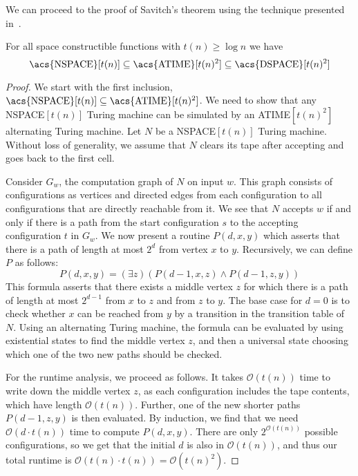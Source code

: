 We can proceed to the proof of Savitch's theorem using the technique presented in~\cite{descriptive-complexity}.
\begin{theorem}
    For all space constructible functions with $t(n) \geq \log n$ we have
    \[
        \text{\upshape \acs{NSPACE}}[t(n)] \subseteq \text{\upshape \acs{ATIME}}[t(n)^2] \subseteq \text{\upshape \acs{DSPACE}}[t(n)^2]
    \]
\end{theorem}

\begin{proof}
    We start with the first inclusion, $\text{\acs{NSPACE}$[t(n)]$} \subseteq \text{\acs{ATIME}$[t(n)^2]$}$.
    We need to show that any \acs{NSPACE}$[t(n)]$ Turing machine can be simulated by an \acs{ATIME}$[t(n)^2]$ alternating Turing machine.
    Let $N$ be a \acs{NSPACE}$[t(n)]$ Turing machine.
    Without loss of generality, we assume that $N$ clears its tape after accepting and goes back to the first cell.

    Consider $G_w$, the computation graph of $N$ on input $w$.
    This graph consists of configurations as vertices and directed edges from each configuration to all configurations that are directly reachable from it.
    We see that $N$ accepts $w$ if and only if there is a path from the start configuration $s$ to the accepting configuration $t$ in $G_w$.
    We now present a routine $P(d, x, y)$ which asserts that there is a path of length at most $2^{d}$ from vertex $x$ to $y$.
    Recursively, we can define $P$ as follows:
    \[
        P(d, x, y) = (\exists z)(P(d - 1, x, z) \land P(d - 1, z, y))
    \]
    This formula asserts that there exists a middle vertex $z$ for which there is a path of length at most $2^{d - 1}$ from $x$ to $z$ and from $z$ to $y$.
    The base case for $d = 0$ is to check whether $x$ can be reached from $y$ by a transition in the transition table of $N$.
    Using an alternating Turing machine, the formula can be evaluated by using existential states to find the middle vertex $z$, and then a universal state choosing which one of the two new paths should be checked.

    For the runtime analysis, we proceed as follows.
    It takes $\mathcal{O}(t(n))$ time to write down the middle vertex $z$, as each configuration includes the tape contents, which have length $\mathcal{O}(t(n))$.
    Further, one of the new shorter paths $P(d - 1, z, y)$ is then evaluated.
    By induction, we find that we need $\mathcal{O}(d\cdot t(n))$ time to compute $P(d, x, y)$.
    There are only $2^{\mathcal{O}(t(n))}$ possible configurations, so we get that the initial $d$ is also in $\mathcal{O}(t(n))$, and thus our total runtime is $\mathcal{O}(t(n)\cdot t(n)) = \mathcal{O}(t(n)^2)$.
    

\end{proof}
